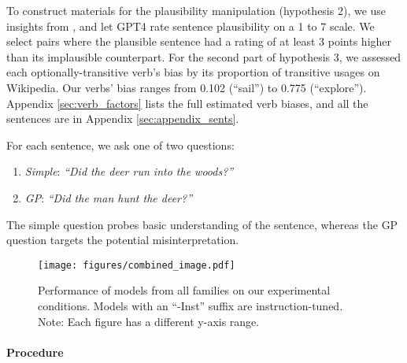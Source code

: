 To construct materials for the plausibility manipulation  (hypothesis 2), we use
insights from \citet{amouyal-etal-2024-large}, and let GPT4 rate sentence plausibility on a 1 to 7 scale. We select pairs where the plausible sentence had a rating of at least 3 points higher than its implausible counterpart. For the second part of hypothesis 3, we assessed each optionally-transitive verb's bias by its proportion of transitive usages on Wikipedia. Our verbs' bias ranges from 0.102 (``sail'') to 0.775 (``explore''). Appendix \ref{sec:verb_factors} lists the full estimated verb biases, and all the sentences are in Appendix \ref{sec:appendix_sents}.


For each sentence, we ask one of two questions:
\begin{enumerate}[nosep]
    \item \emph{Simple}: \emph{``Did the deer run into the woods?''}
    \item \emph{GP}: \emph{``Did the man hunt the deer?''}
\end{enumerate}
The simple question probes basic understanding of the sentence, whereas the GP question targets the potential misinterpretation. 

\begin{figure*}[t!]
    \centering
    \scriptsize
    \texttt{[image: figures/combined\_image.pdf]}
    \caption{Performance of models from all families on our experimental conditions. Models with an ``-Inst'' suffix are instruction-tuned. Note: Each figure has a different y-axis range.}
    \label{fig:model_global_perf}
\end{figure*}

\paragraph{Procedure} 

